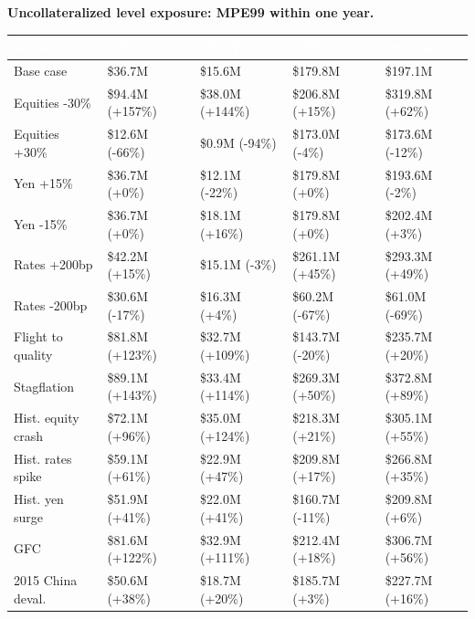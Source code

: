 \documentclass[11pt,letterpaper]{article}
\begin{document}
\textbf{Uncollateralized level exposure: MPE99 within one year.}

{\scriptsize\setlength{\LTpre}{4pt}\setlength{\LTpost}{6pt}
\begin{longtable}{>{\raggedright\arraybackslash}p{}>{\raggedright\arraybackslash}p{}>{\raggedright\arraybackslash}p{}>{\raggedright\arraybackslash}p{}>{\raggedright\arraybackslash}p{}}
\toprule
\rowcolor{navy}\textbf{\textcolor{white}{Scenario}} & \textbf{\textcolor{white}{CPTY\_A}} & \textbf{\textcolor{white}{CPTY\_B}} & \textbf{\textcolor{white}{CPTY\_C}} & \textbf{\textcolor{white}{Portfolio}} \\
\endhead
Base case & \$36.7M & \$15.6M & \$179.8M & \$197.1M \\
\rowcolor{gray!9}Equities -30\% & \$94.4M (+157\%) & \$38.0M (+144\%) & \$206.8M (+15\%) & \$319.8M (+62\%) \\
Equities +30\% & \$12.6M (-66\%) & \$0.9M (-94\%) & \$173.0M (-4\%) & \$173.6M (-12\%) \\
\rowcolor{gray!9}Yen +15\% & \$36.7M (+0\%) & \$12.1M (-22\%) & \$179.8M (+0\%) & \$193.6M (-2\%) \\
Yen -15\% & \$36.7M (+0\%) & \$18.1M (+16\%) & \$179.8M (+0\%) & \$202.4M (+3\%) \\
\rowcolor{gray!9}Rates +200bp & \$42.2M (+15\%) & \$15.1M (-3\%) & \$261.1M (+45\%) & \$293.3M (+49\%) \\
Rates -200bp & \$30.6M (-17\%) & \$16.3M (+4\%) & \$60.2M (-67\%) & \$61.0M (-69\%) \\
\rowcolor{gray!9}Flight to quality & \$81.8M (+123\%) & \$32.7M (+109\%) & \$143.7M (-20\%) & \$235.7M (+20\%) \\
Stagflation & \$89.1M (+143\%) & \$33.4M (+114\%) & \$269.3M (+50\%) & \$372.8M (+89\%) \\
\rowcolor{gray!9}Hist. equity crash & \$72.1M (+96\%) & \$35.0M (+124\%) & \$218.3M (+21\%) & \$305.1M (+55\%) \\
Hist. rates spike & \$59.1M (+61\%) & \$22.9M (+47\%) & \$209.8M (+17\%) & \$266.8M (+35\%) \\
\rowcolor{gray!9}Hist. yen surge & \$51.9M (+41\%) & \$22.0M (+41\%) & \$160.7M (-11\%) & \$209.8M (+6\%) \\
2008 GFC & \$81.6M (+122\%) & \$32.9M (+111\%) & \$212.4M (+18\%) & \$306.7M (+56\%) \\
\rowcolor{gray!9}2015 China deval. & \$50.6M (+38\%) & \$18.7M (+20\%) & \$185.7M (+3\%) & \$227.7M (+16\%) \\
\bottomrule
\end{longtable}}
\end{document}
